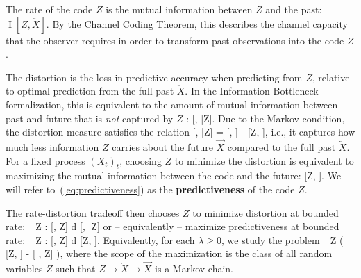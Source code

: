 \documentclass[entropy,article,submit,moreauthors,pdftex,10pt,a4paper]{Definitions/mdpi}
\newcommand{\future}{\overrightarrow{X}}
\newcommand{\past}{\overleftarrow{X}}
\newcommand{\key}{\textbf}
\let\oldequation\equation
\let\oldendequation\endequation
\renewenvironment{equation}
  {\linenomathNonumbers\oldequation}
  {\oldendequation\endlinenomath}
\begin{document}
The rate of the code $Z$ is the mutual information between $Z$ and the past: $\operatorname{I}[Z, \past]$.
By the Channel Coding Theorem, this describes the channel capacity that the observer requires in order to transform past observations into the code $Z$.

The distortion is the loss in predictive accuracy when predicting from $Z$, relative to optimal prediction from the full past $\past$.
In the Information Bottleneck formalization, this is equivalent to the amount of mutual information between past and future that is \emph{not} captured by $Z$ \citep{harremoes2007information}: 
\begin{equation}
	[\past, \future|Z].
\end{equation}
Due to the Markov condition, the distortion measure satisfies the relation
\begin{equation}
	[\past, \future|Z] = [\past, \future] - [Z, \future],
\end{equation}
i.e., it captures how much less information $Z$ carries about the future $\future$ compared to the full past $\past$.
For a fixed process $(X_t)_t$, choosing $Z$ to minimize the distortion is equivalent to maximizing the mutual information between the code and the future:
\begin{equation}\label{eq:predictiveness}
[Z, \future].
\end{equation}
We will refer to~(\ref{eq:predictiveness}) as the \key{predictiveness} of the code $Z$.

The rate-distortion tradeoff then chooses $Z$ to %
 minimize distortion at bounded rate:
\begin{equation}
\min_{Z :  [\past, Z] \leq d}  [\past, \future|Z] 
\end{equation}
or -- equivalently -- maximize predictiveness at bounded rate:
\begin{equation}
\max_{Z :  [\past, Z] \leq d}  [Z, \future].
\end{equation}
Equivalently, for each  $\lambda \geq 0$, we study the problem 
\begin{equation}\label{eq:ib}
	\max_{Z} \left( [Z, \future] - \lambda \cdot {}[ \past, Z] \right),
\end{equation}
where the scope of the maximization is the class of all random variables $Z$ such that $Z \rightarrow \past \rightarrow \future$ is a Markov chain. %
\end{document}
